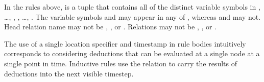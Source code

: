 In the rules above,  is a tuple that contains all of the distinct variable
symbols in , \ldots, , , \ldots,
.  The variable symbols  and  may appear in
any of , whereas  and  may not.
Head relation name  may not be , , or . Relations
 may not be
, , or \dedalus{<}. %

The use of a single location specifier and timestamp in rule bodies intuitively corresponds to considering deductions that can be evaluated at a single node at a single point in time.  Inductive rules use the  relation to carry the results of deductions into the next visible timestep.

\begin{comment}
\subsection{Causality rewrite}

As written, asynchronous rules can allow messages to travel back in time.  Intuitively, we strive to allow only those models that are causally plausible: a message sent by a node at local timestamp $s$ cannot cause a message to arrive in the past of node $x$ (i.e., before local timestamp $s$).

\begin{Drules}
\drule{notZero(T)}
      {succ(T,S)}
\drule{zero(T)}
      {time(T), \lnot notZero(T)}
\end{Drules}

\begin{Drules}
\drule{rcvClock(X,S,Y,S)}
      {node(X), node(Y), X \neq Y, zero(S)}
\drule{rcvClock(X,S,X,S')}
      {node(X), timeSucc(S,S')}
\drule{rcvClock(X,S',Y,T)}
      {clock(X,S,Y,T), X \neq Y, timeSucc(S,S')}
\end{Drules}

\footnote{We can get \neq from < by disjunction.}

Given the following asynchronous rule, without any causality enforced:

...

We rewrite it as the following batch of rules:

...
\end{comment}

